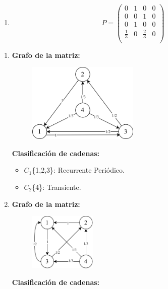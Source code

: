 \documentclass{templateNote}
\begin{document}
\begin{enumerate}
\begin{enumerate}[label=\alph*)]
        \item
        \[
        P = \left(
        \begin{array}{cccc}
            0           & 1 & 0           & 0\\
            0           & 0 & 1           & 0\\
            0           & 1 & 0           & 0\\
            \frac{1}{3} & 0 & \frac{2}{3} & 0\\
        \end{array}
        \right)
        \]
    \end{enumerate}

    \begin{enumerate}[label=\alph*)]    
        \item \textbf{Grafo de la matriz:}
        \begin{figure}[H]
            \centering
            \includegraphics[width=0.5\textwidth]{img/ejer4.png}
        \end{figure}
        \textbf{Clasificación de cadenas:}
        \begin{itemize}
            \item $C_1$\{1,2,3\}: Recurrente Periódico.
            \item $C_2$\{4\}: Transiente.
        \end{itemize}

        \item \textbf{Grafo de la matriz:}
        \begin{figure}[H]
            \centering
            \includegraphics[width=0.3\textwidth]{img/ejer42.png}
        \end{figure}
        \textbf{Clasificación de cadenas:}


\end{enumerate}
\end{enumerate}
\end{document}
